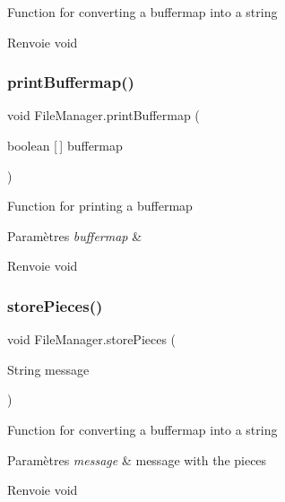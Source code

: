 Function for converting a buffermap into a string

\begin{DoxyReturn}{Renvoie}
void 
\end{DoxyReturn}
\mbox{\label{classFileManager_ae91ea295ea5951ecab2d249ea1c2f8e7}} 
\subsubsection{\texorpdfstring{print\+Buffermap()}{printBuffermap()}}
{\footnotesize\ttfamily void File\+Manager.\+print\+Buffermap (\begin{DoxyParamCaption}\item[{boolean \mbox{[}$\,$\mbox{]}}]{buffermap }\end{DoxyParamCaption})\hspace{0.3cm}{\ttfamily [inline]}}

Function for printing a buffermap


\begin{DoxyParams}{Paramètres}
{\em buffermap} & \\
\hline
\end{DoxyParams}
\begin{DoxyReturn}{Renvoie}
void 
\end{DoxyReturn}
\mbox{\label{classFileManager_a3612335ed4f691a47636d95dc7620a50}} 
\subsubsection{\texorpdfstring{store\+Pieces()}{storePieces()}}
{\footnotesize\ttfamily void File\+Manager.\+store\+Pieces (\begin{DoxyParamCaption}\item[{String}]{message }\end{DoxyParamCaption})\hspace{0.3cm}{\ttfamily [inline]}}

Function for converting a buffermap into a string


\begin{DoxyParams}{Paramètres}
{\em message} & message with the pieces \\
\hline
\end{DoxyParams}
\begin{DoxyReturn}{Renvoie}
void 
\end{DoxyReturn}
\mbox{\label{classFileManager_a907bacc448d9077430f89e8304f75db8}} 
